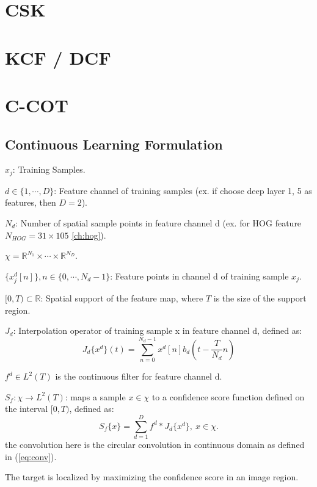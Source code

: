 \documentclass[12pt]{article}
\numberwithin{equation}{section}
\begin{document}
\section{CSK \cite{henriques2012exploiting}}

\section{KCF / DCF \cite{henriques2015high}}

\section{C-COT \cite{DanelljanECCV2016}}

\subsection{Continuous Learning Formulation}
$x_j$: Training Samples. \par
$d \in \{1, \cdots , D\}$: Feature channel of training samples (ex. if choose deep layer 1, 5 as features, then $D = 2$). \par
$N_d$: Number of spatial sample points in feature channel d (ex. for HOG feature $N_{HOG}=31 \times 105$ \autoref{ch:hog}). \par
$\chi=\mathbb{R}^{N_1} \times \cdots \times \mathbb{R}^{N_D}$. \par
$\{x^d_j[n]\}, n \in \{0, \cdots, N_d -1\}$: Feature points in channel d of training sample $x_j$.\par
$[0, T) \subset \mathbb{R} $: Spatial support of the feature map, where $T$ is the size of the support region.\par
$J_d$: Interpolation operator of training sample x in feature channel d, defined as: 
\begin{equation}
	J_d\{x^d\}(t)=\sum^{N_d-1}_{n=0} x^d[n] b_d(t-\frac{T}{N_d} n)
\end{equation} \par
$f^d \in L^2(T)$ is the continuous filter for feature channel d. \par
$S_f: \chi \rightarrow L^2(T)$: maps a sample $x \in \chi$ to a confidence score function defined on the interval $[0, T)$, defined as: 
\begin{equation} \label{eq:score}
	S_f\{x\}=\sum^D_{d=1} f^d * J_d\{x^d\}, \  x \in \chi.
\end{equation} 
the convolution here is the circular convolution in continuous domain as defined in (\ref{eq:conv}). \par
The target is localized by maximizing the confidence score in an image region. \par
\end{document}
